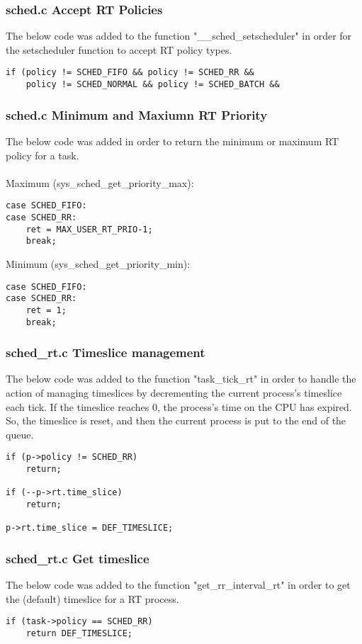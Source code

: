 \documentclass[12pt,letterpaper]{article}
\begin{document}
\subsubsection{sched.c Accept RT Policies}
The below code was added to the function "__sched_setscheduler" in order for
the setscheduler function to accept RT policy types.
\begin{Verbatim}[frame=single]
if (policy != SCHED_FIFO && policy != SCHED_RR &&
	policy != SCHED_NORMAL && policy != SCHED_BATCH &&
\end{Verbatim}
\subsubsection{sched.c Minimum and Maxiumn RT Priority}
The below code was added in order to return the minimum or maximum RT policy for a task.\\
\\
Maximum (sys_sched_get_priority_max):
\begin{Verbatim}[frame=single]
case SCHED_FIFO:
case SCHED_RR:
	ret = MAX_USER_RT_PRIO-1;
	break;
\end{Verbatim}
Minimum (sys_sched_get_priority_min):
\begin{Verbatim}[frame=single]
case SCHED_FIFO:
case SCHED_RR:
	ret = 1;
	break;
\end{Verbatim}
\subsubsection{sched_rt.c Timeslice management}
The below code was added to the function "task_tick_rt" in order to handle the
action of managing timeslices by decrementing the current process's timeslice
each tick. If the timeslice reaches 0, the process's time on the CPU has
expired. So, the timeslice is reset, and then the current process is put to the
end of the queue.
\begin{Verbatim}[frame=single]
if (p->policy != SCHED_RR)
	return;

if (--p->rt.time_slice)
	return;

p->rt.time_slice = DEF_TIMESLICE;
\end{Verbatim}
\subsubsection{sched_rt.c Get timeslice}
The below code was added to the function "get_rr_interval_rt" in order to get
the (default) timeslice for a RT process.
\begin{Verbatim}[frame=single]
if (task->policy == SCHED_RR)
	return DEF_TIMESLICE;
\end{Verbatim}
\end{document}
